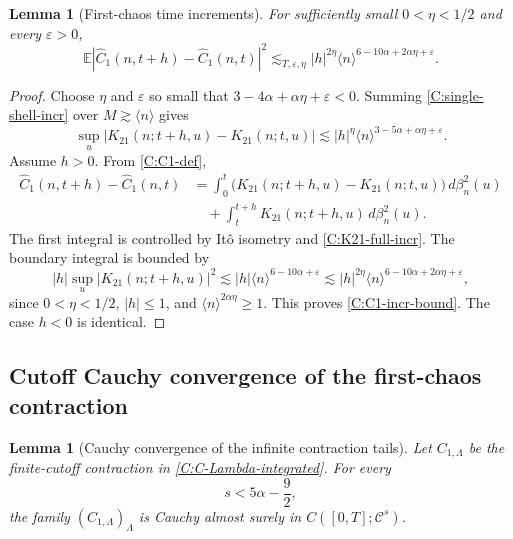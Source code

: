 \documentclass[10pt]{amsart}
\numberwithin{equation}{section}
\theoremstyle{plain}
\newtheorem{lemma}[theorem]{Lemma}
\theoremstyle{definition}
\theoremstyle{remark}
\newcommand{\E}{\mathbb{E}}
\newcommand{\C}{\mathcal{C}}
\newcommand{\eps}{\varepsilon}
\newcommand{\la}{\langle}
\newcommand{\ra}{\rangle}
\newcommand{\wh}{\widehat}
\begin{document}
\begin{lemma}[First-chaos time increments]\label{lem:C-first-incr}
For sufficiently small \(0<\eta<1/2\) and every \(\eps>0\),
\begin{equation}\label{C:C1-incr-bound}
        \E|\wh C_1(n,t+h)-\wh C_1(n,t)|^2
        \lesssim_{T,\eps,\eta}
        |h|^{2\eta}\la n\ra^{6-10\alpha+2\alpha\eta+\eps}.
\end{equation}
\end{lemma}

\begin{proof}
Choose \(\eta\) and \(\eps\) so small that \(3-4\alpha+\alpha\eta+\eps<0\).  Summing \eqref{C:single-shell-incr} over \(M\gtrsim\la n\ra\) gives
\begin{equation}\label{C:K21-full-incr}
        \sup_u|K_{21}(n;t+h,u)-K_{21}(n;t,u)|
        \lesssim
        |h|^\eta\la n\ra^{3-5\alpha+\alpha\eta+\eps}.
\end{equation}
Assume \(h>0\).  From \eqref{C:C1-def},
\[
\begin{aligned}
        \wh C_1(n,t+h)-\wh C_1(n,t)
        &=\int_0^t\bigl(K_{21}(n;t+h,u)-K_{21}(n;t,u)\bigr)\,d\beta_n^2(u) \\
        &\quad+
        \int_t^{t+h}K_{21}(n;t+h,u)\,d\beta_n^2(u).
\end{aligned}
\]
The first integral is controlled by Itô isometry and \eqref{C:K21-full-incr}.  The boundary integral is bounded by
\[
        |h|\sup_u|K_{21}(n;t+h,u)|^2
        \lesssim
        |h|\la n\ra^{6-10\alpha+\eps}
        \lesssim
        |h|^{2\eta}\la n\ra^{6-10\alpha+2\alpha\eta+\eps},
\]
since \(0<\eta<1/2\), \(|h|\le1\), and \(\la n\ra^{2\alpha\eta}\ge1\).  This proves \eqref{C:C1-incr-bound}.  The case \(h<0\) is identical.
\end{proof}

\subsection{Cutoff Cauchy convergence of the first-chaos contraction}

\begin{lemma}[Cauchy convergence of the infinite contraction tails]\label{lem:C-first-tail}
Let \(C_{1,\Lambda}\) be the finite-cutoff contraction in \eqref{C:C-Lambda-integrated}.  For every
\[
        s<5\alpha-\frac92,
\]
the family \((C_{1,\Lambda})_\Lambda\) is Cauchy almost surely in \(C([0,T];\C^s)\).
\end{lemma}
\end{document}
